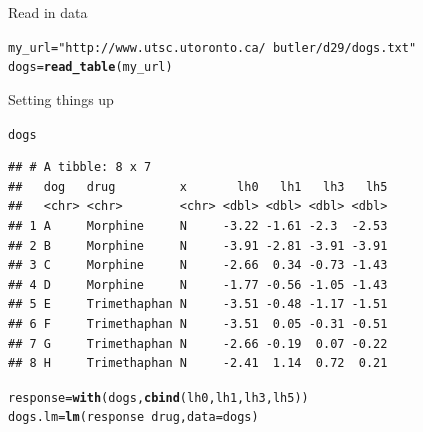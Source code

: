 \documentclass[unknownkeysallowed]{beamer}\usepackage[]{graphicx}\usepackage[]{color}
\makeatletter
\newcommand{\hlstr}[1]{\textcolor[rgb]{0.192,0.494,0.8}{#1}}%
\newcommand{\hlopt}[1]{\textcolor[rgb]{0,0,0}{#1}}%
\newcommand{\hlstd}[1]{\textcolor[rgb]{0.345,0.345,0.345}{#1}}%
\newcommand{\hlkwb}[1]{\textcolor[rgb]{0.69,0.353,0.396}{#1}}%
\newcommand{\hlkwc}[1]{\textcolor[rgb]{0.333,0.667,0.333}{#1}}%
\newcommand{\hlkwd}[1]{\textcolor[rgb]{0.737,0.353,0.396}{\textbf{#1}}}%
\newenvironment{kframe}{%
 \def\at@end@of@kframe{}%
 \ifinner\ifhmode%
  \def\at@end@of@kframe{\end{minipage}}%
  \begin{minipage}{\columnwidth}%
 \fi\fi%
 \def\FrameCommand##1{\hskip\@totalleftmargin \hskip-\fboxsep
 \colorbox{shadecolor}{##1}\hskip-\fboxsep
     \hskip-\linewidth \hskip-\@totalleftmargin \hskip\columnwidth}%
 \MakeFramed {\advance\hsize-\width
   \@totalleftmargin\z@ \linewidth\hsize
   \@setminipage}}%
 {\par\unskip\endMakeFramed%
 \at@end@of@kframe}
\newenvironment{knitrout}{}{} %
\makeatother
\begin{document}
\begin{frame}[fragile]{Read in data}
  
\begin{knitrout}
\color{fgcolor}\begin{kframe}
\begin{alltt}
\hlstd{my_url}\hlkwb{=}\hlstr{"http://www.utsc.utoronto.ca/~butler/d29/dogs.txt"}
\hlstd{dogs}\hlkwb{=}\hlkwd{read_table}\hlstd{(my_url)}
\end{alltt}


{\ttfamily\noindent\itshape\color{messagecolor}{\#\# Parsed with column specification:\\\#\# cols(\\\#\#\ \  dog = col\_character(),\\\#\#\ \  drug = col\_character(),\\\#\#\ \  x = col\_character(),\\\#\#\ \  lh0 = col\_double(),\\\#\#\ \  lh1 = col\_double(),\\\#\#\ \  lh3 = col\_double(),\\\#\#\ \  lh5 = col\_double()\\\#\# )}}\end{kframe}
\end{knitrout}
  
\end{frame}

\begin{frame}[fragile]{Setting things up}

 
\begin{knitrout}\small
{}\color{fgcolor}\begin{kframe}
\begin{alltt}
\hlstd{dogs}
\end{alltt}
\begin{verbatim}
## # A tibble: 8 x 7
##   dog   drug         x       lh0   lh1   lh3   lh5
##   <chr> <chr>        <chr> <dbl> <dbl> <dbl> <dbl>
## 1 A     Morphine     N     -3.22 -1.61 -2.3  -2.53
## 2 B     Morphine     N     -3.91 -2.81 -3.91 -3.91
## 3 C     Morphine     N     -2.66  0.34 -0.73 -1.43
## 4 D     Morphine     N     -1.77 -0.56 -1.05 -1.43
## 5 E     Trimethaphan N     -3.51 -0.48 -1.17 -1.51
## 6 F     Trimethaphan N     -3.51  0.05 -0.31 -0.51
## 7 G     Trimethaphan N     -2.66 -0.19  0.07 -0.22
## 8 H     Trimethaphan N     -2.41  1.14  0.72  0.21
\end{verbatim}
\begin{alltt}
\hlstd{response}\hlkwb{=}\hlkwd{with}\hlstd{(dogs,}\hlkwd{cbind}\hlstd{(lh0,lh1,lh3,lh5))}
\hlstd{dogs.lm}\hlkwb{=}\hlkwd{lm}\hlstd{(response}\hlopt{~}\hlstd{drug,}\hlkwc{data}\hlstd{=dogs)}
\end{alltt}
\end{kframe}
\end{knitrout}
  
    
\end{frame}
\end{document}
